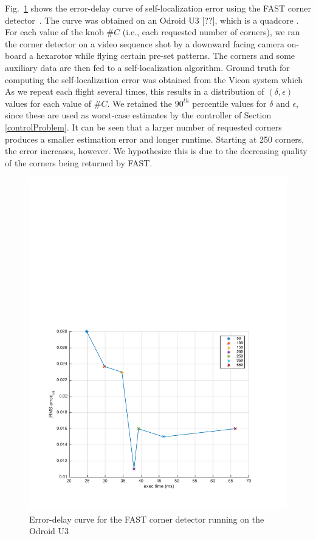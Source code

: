 Fig.~\ref{fig:fast} shows the error-delay curve of self-localization error using the FAST corner detector~\cite{rosten_2006_machine}.
The curve was obtained on an Odroid U3 [??], which is a quadcore .
For each value of the knob $\#C$ (i.e., each requested number of corners), we ran the corner detector on a video sequence shot by a downward facing camera on-board a hexarotor while flying certain pre-set patterns.
The corners and some auxiliary data are then fed to a self-localization algorithm.
Ground truth for computing the self-localization error was obtained from the Vicon system which 
As we repeat each flight several times, this results in a distribution of $(\delta,\epsilon)$ values for each value of $\#C$. 
We retained the $90^{th}$ percentile values for $\delta$ and $\epsilon$, since these are used as worst-case estimates by the controller of Section \ref{controlProblem}.
It can be seen that a larger number of requested corners produces a smaller estimation error and longer runtime.
Starting at 250 corners, the error increases, however.
We hypothesize this is due to the decreasing quality of the corners being returned by FAST.
\begin{figure}[t]
\centering
\includegraphics[width=0.7\linewidth]{figures/init_eps_delta_90th}
\caption{Error-delay curve for the FAST corner detector running on the Odroid U3}
\label{fig:fast}
\end{figure}


